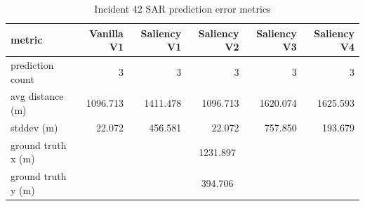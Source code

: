 \begin{table}[ht]
\centering
\caption{Incident 42 SAR prediction error metrics}
\label{tab:sar-incident-42}
\begin{tabular}{lrrrrr}
\hline
metric & Vanilla V1 & Saliency V1 & Saliency V2 & Saliency V3 & Saliency V4 \\
\hline
prediction count & 3 & 3 & 3 & 3 & 3 \\
avg distance (m) & 1096.713 & 1411.478 & 1096.713 & 1620.074 & 1625.593 \\
stddev (m) & 22.072 & 456.581 & 22.072 & 757.850 & 193.679 \\
ground truth x (m) & \multicolumn{5}{c}{1231.897} \\
ground truth y (m) & \multicolumn{5}{c}{394.706} \\
\hline
\end{tabular}
\end{table}
